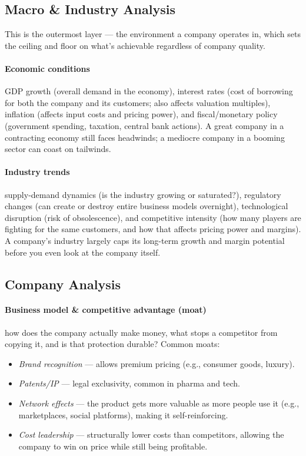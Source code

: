 \documentclass[12pt,openany]{book}
\begin{document}
\subsection{Macro \& Industry Analysis}

This is the outermost layer --- the environment a company operates in, which sets the ceiling and floor on what's achievable regardless of company quality.

\paragraph{Economic conditions} GDP growth (overall demand in the economy), interest rates (cost of borrowing for both the company and its customers; also affects valuation multiples), inflation (affects input costs and pricing power), and fiscal/monetary policy (government spending, taxation, central bank actions). A great company in a contracting economy still faces headwinds; a mediocre company in a booming sector can coast on tailwinds.

\paragraph{Industry trends} supply-demand dynamics (is the industry growing or saturated?), regulatory changes (can create or destroy entire business models overnight), technological disruption (risk of obsolescence), and competitive intensity (how many players are fighting for the same customers, and how that affects pricing power and margins). A company's industry largely caps its long-term growth and margin potential before you even look at the company itself.

\subsection{Company Analysis}

\paragraph{Business model \& competitive advantage (moat)} how does the company actually make money, what stops a competitor from copying it, and is that protection durable? Common moats:

\begin{itemize}[leftmargin=*]
    \item \emph{Brand recognition} --- allows premium pricing (e.g., consumer goods, luxury).
    \item \emph{Patents/IP} --- legal exclusivity, common in pharma and tech.
    \item \emph{Network effects} --- the product gets more valuable as more people use it (e.g., marketplaces, social platforms), making it self-reinforcing.
    \item \emph{Cost leadership} --- structurally lower costs than competitors, allowing the company to win on price while still being profitable.
\end{itemize}
\end{document}
